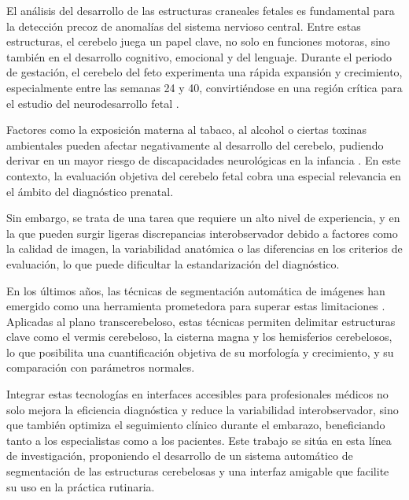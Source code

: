 
El análisis del desarrollo de las estructuras craneales fetales es fundamental para la detección precoz de anomalías del sistema nervioso central. Entre estas estructuras, el cerebelo juega un papel clave, no solo en funciones motoras, sino también en el desarrollo cognitivo, emocional y del lenguaje. Durante el periodo de gestación, el cerebelo del feto experimenta una rápida expansión y crecimiento, especialmente entre las semanas 24 y 40, convirtiéndose en una región crítica para el estudio del neurodesarrollo fetal \cite{volpe2009}. 

Factores como la exposición materna al tabaco, al alcohol o ciertas toxinas ambientales pueden afectar negativamente al desarrollo del cerebelo, pudiendo derivar en un mayor riesgo de discapacidades neurológicas en la infancia \cite{koning2017impacts}. En este contexto, la evaluación objetiva del cerebelo fetal cobra una especial relevancia en el ámbito del diagnóstico prenatal.

Sin embargo, se trata de una tarea que requiere un alto nivel de experiencia, y en la que pueden surgir ligeras discrepancias interobservador debido a factores como la calidad de imagen, la variabilidad anatómica o las diferencias en los criterios de evaluación, lo que puede dificultar la estandarización del diagnóstico. 

En los últimos años, las técnicas de segmentación automática de imágenes han emergido como una herramienta prometedora para superar estas limitaciones \cite{hesamian2019}. Aplicadas al plano transcerebeloso, estas técnicas permiten delimitar estructuras clave como el vermis cerebeloso, la cisterna magna y los hemisferios cerebelosos, lo que posibilita una cuantificación objetiva de su morfología y crecimiento, y su comparación con parámetros normales.

Integrar estas tecnologías en interfaces accesibles para profesionales médicos no solo mejora la eficiencia diagnóstica y reduce la variabilidad interobservador, sino que también optimiza el seguimiento clínico durante el embarazo, beneficiando tanto a los especialistas como a los pacientes. Este trabajo se sitúa en esta línea de investigación, proponiendo el desarrollo de un sistema automático de segmentación de las estructuras cerebelosas y una interfaz amigable que facilite su uso en la práctica rutinaria. 


